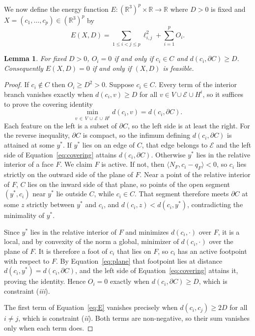 \documentclass[preprint,12pt]{elsarticle}
\newtheorem{lemma}{Lemma}
\theoremstyle{remark}
\def \R {\mathbb{R}}
\newcommand{\ang}[1]{\langle #1 \rangle}
\begin{document}
We now define the energy function $E: (\R^3)^p \times \R \to \R$ where $D > 0$
is fixed and $X = (c_1, \dots, c_p) \in (\R^3)^p$ by
\begin{equation}
  E(X, D) = \sum_{1 \le i < j \le p} \ell_{i, j}^2 + \sum_{i = 1}^p O_i.
  \label{eq:E}
\end{equation}

\begin{lemma}\label{lem:zero}
  For fixed $D > 0$, $O_i = 0$ if and only if $c_i \in C$ and $d(c_i, \partial
  C) \ge D$. Consequently $E(X, D) = 0$ if and only if $(X, D)$ is feasible.
\end{lemma}

\begin{proof}
  If $c_i \notin C$ then $O_i \ge D^2 > 0$. Suppose $c_i \in C$. Every term of
  the interior branch vanishes exactly when $d(c_i, v) \ge D$ for all $v \in V
  \cup \mathcal{E} \cup H^i$, so it suffices to prove the covering identity
  \begin{equation}
    \min_{v \, \in \, V \, \cup \, \mathcal{E} \, \cup \, H^i} d(c_i, v)
    = d(c_i, \partial C).
    \label{eq:covering}
  \end{equation}
  Each feature on the left is a subset of $\partial C$, so the left side is at
  least the right. For the reverse inequality, $\partial C$ is compact, so the
  infimum defining $d(c_i, \partial C)$ is attained at some $y^*$. If $y^*$ lies
  on an edge of $C$, that edge belongs to $\mathcal{E}$ and the left side of
  Equation~\ref{eq:covering} attains $d(c_i, \partial C)$. Otherwise $y^*$ lies
  in the relative interior of a face $F$. We claim $F$ is active. If not, then
  $\ang{N_F, c_i - q_F} < 0$, so $c_i$ lies strictly on the outward side of the
  plane of $F$. Near a point of the relative interior of $F$, $C$ lies on the
  inward side of that plane, so points of the open segment $(y^*, c_i)$ near
  $y^*$ lie outside $C$, while $c_i \in C$. That segment therefore meets
  $\partial C$ at some $z$ strictly between $y^*$ and $c_i$, and $d(c_i, z) <
  d(c_i, y^*)$, contradicting the minimality of $y^*$.

  Since $y^*$ lies in the relative interior of $F$ and minimizes $d(c_i, \cdot)$
  over $F$, it is a local, and by convexity of the norm a global, minimizer of
  $d(c_i, \cdot)$ over the plane of $F$. It is therefore a foot of $c_i$ that
  lies on $F$, so $c_i$ has an active footpoint with respect to $F$. By
  Equation~\ref{eq:plane} that footpoint lies at distance $d(c_i, y^*) = d(c_i,
  \partial C)$, and the left side of Equation~\ref{eq:covering} attains it,
  proving the identity. Hence $O_i = 0$ exactly when $d(c_i, \partial C) \ge D$,
  which is constraint (\textit{iii}).

  The first term of Equation~\ref{eq:E} vanishes precisely when $d(c_i, c_j) \ge
  2D$ for all $i \ne j$, which is constraint (\textit{ii}). Both terms are
  non-negative, so their sum vanishes only when each term does.
\end{proof}
\end{document}

